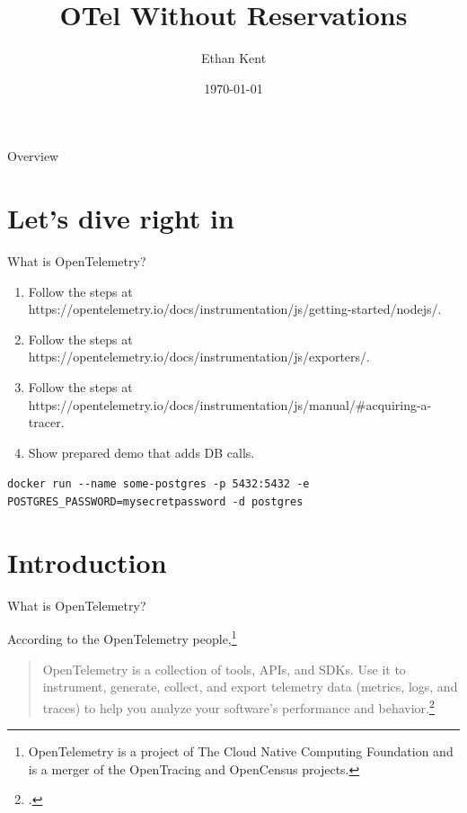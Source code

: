 \documentclass[aspectratio=169]{beamer}
\title{OTel Without Reservations}
\author{Ethan Kent}
\date{\today}
\begin{document}
\begin{frame}
  \titlepage
\end{frame}

\begin{frame}{Overview}
  \tableofcontents
\end{frame}

\section{Let's dive right in}

\begin{frame}{What is OpenTelemetry?}
  \begin{enumerate}
    \item Follow the steps at https://opentelemetry.io/docs/instrumentation/js/getting-started/nodejs/.
    \item Follow the steps at https://opentelemetry.io/docs/instrumentation/js/exporters/.
    \item Follow the steps at https://opentelemetry.io/docs/instrumentation/js/manual/\#acquiring-a-tracer.
    \item Show prepared demo that adds DB calls.
  \end{enumerate}


  \lstinline[basicstyle=\tiny]{docker run --name some-postgres -p 5432:5432 -e POSTGRES_PASSWORD=mysecretpassword -d postgres}
\end{frame}

\section{Introduction}
\begin{frame}{What is OpenTelemetry?}

  According to the OpenTelemetry people,\footnote{OpenTelemetry is a project of
    The Cloud Native Computing Foundation and is a merger of the OpenTracing and
    OpenCensus projects.}

  \vspace{1em}

  \begin{quote}
    OpenTelemetry is a collection of tools, APIs, and SDKs. Use it to
    instrument, generate, collect, and export telemetry data (metrics, logs, and
    traces) to help you analyze your software's performance and
    behavior.\footcite{otel-site}
  \end{quote}
\end{frame}
\end{document}
